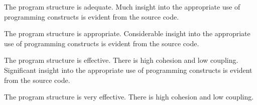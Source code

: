 \documentclass{../../fal_assignment}
\begin{document}
\begin{markingrubric}
            \par The program structure is adequate.
        \grade Much insight into the appropriate use of programming constructs is evident from the source code.
            \par The program structure is appropriate.
        \grade Considerable insight into the appropriate use of programming constructs is evident from the source code.
            \par The program structure is effective. There is high cohesion and low coupling.
        \grade Significant insight into the appropriate use of programming constructs is evident from the source code.
            \par The program structure is very effective. There is high cohesion and low coupling.            
\end{markingrubric}
\end{document}
